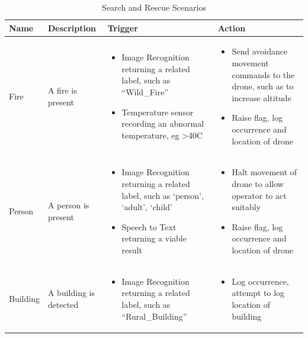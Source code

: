 \documentclass{article}
\begin{document}
\begin{table}[ht]
\caption{Search and Rescue Scenarios}
\hyphenchar{}
\centering
\begin{tabularx}{\textwidth}{| >{\centering}m{1.5cm} | >{\centering}m{2cm} | X | X |}
    \hline
    Name & Description & Trigger & Action \\ \hline
    Fire & \vspace{\baselineskip} A fire is present &
    \begin{itemize}[topsep=0pt, leftmargin=0cm,itemindent=.5cm,labelwidth=\itemindent,labelsep=0cm,align=left]
        \item Image Recognition returning a related label, such as “Wild\_Fire”
        \item Temperature sensor recording an abnormal temperature, eg >40C
    \end{itemize} &
    \begin{itemize} [topsep=0pt, leftmargin=0cm,itemindent=.5cm,labelwidth=\itemindent,labelsep=0cm,align=left]
        \item Send avoidance movement commands to the drone, such as to increase altitude
        \item Raise flag, log occurrence and location of drone
    \end{itemize} \\ \hline

    Person & \vspace{\baselineskip} A person is present &
    \begin{itemize} [topsep=0pt, leftmargin=0cm,itemindent=.5cm,labelwidth=\itemindent,labelsep=0cm,align=left]
        \item Image Recognition returning a related label, such as `person', `adult', `child'
        \item Speech to Text returning a viable result
    \end{itemize} &
    \begin{itemize} [topsep=0pt, leftmargin=0cm,itemindent=.5cm,labelwidth=\itemindent,labelsep=0cm,align=left]
        \item Halt movement of drone to allow operator to act suitably
        \item Raise flag, log occurrence and location of drone
    \end{itemize} \\ \hline

    Building & \vspace{\baselineskip} A building is detected &
    \begin{itemize} [topsep=0pt, leftmargin=0cm,itemindent=.5cm,labelwidth=\itemindent,labelsep=0cm,align=left]
        \item Image Recognition returning a related label, such as “Rural\_Building”
    \end{itemize} &
    \begin{itemize} [topsep=0pt, leftmargin=0cm,itemindent=.5cm,labelwidth=\itemindent,labelsep=0cm,align=left]
        \item Log occurrence, attempt to log location of building
    \end{itemize} \\ \hline


\end{tabularx}
\end{table}
\end{document}
